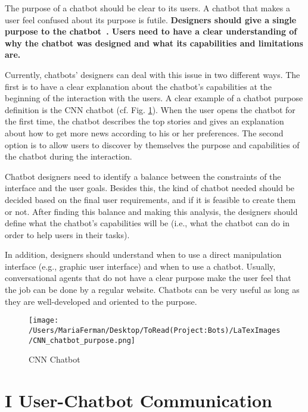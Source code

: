 \documentclass[a4paper,10pt]{article}
\begin{document}
The purpose of a chatbot should be clear to its users. A chatbot that makes a user feel confused about its purpose is futile. \textbf{Designers should give a single purpose to the chatbot~\cite{ChatbotWord}. Users need to have a clear understanding of why the chatbot was designed and what its capabilities and limitations are.}

Currently, chatbots' designers can deal with this issue in two different ways. The first is to have a clear explanation about the chatbot's capabilities at the beginning of the interaction with the users. A clear example of a chatbot purpose definition is the CNN chatbot (cf. Fig. \ref{FigurePurpose}). When the user opens the chatbot for the first time, the chatbot describes the top stories and gives an explanation about how to get more news according to his or her preferences. The second option is to allow users to discover by themselves the purpose and capabilities of the chatbot during the interaction.

Chatbot designers need to identify a balance between the constraints of the interface and the user goals. Besides this, the kind of chatbot needed should be decided based on the final user requirements, and if it is feasible to create them or not. After finding this balance and making this analysis, the designers should define what the chatbot's capabilities will be (i.e., what the chatbot can do in order to help users in their tasks). 

In addition, designers should understand when to use a direct manipulation interface (e.g., graphic user interface) and when to use a chatbot. Usually, conversational agents that do not have a clear purpose make the user feel that the job can be done by a regular website. Chatbots can be very useful as long as they are well-developed and oriented to the purpose.  


\begin{figure}
\centering
\texttt{[image: /Users/MariaFerman/Desktop/ToRead(Project:Bots)/LaTexImages/CNN\_chatbot\_purpose.png]}
\caption{CNN Chatbot}
\label{FigurePurpose}
\end{figure}

\section*{I User-Chatbot Communication}
\end{document}
